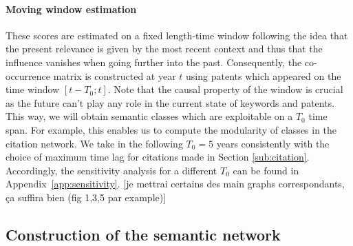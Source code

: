\documentclass[10pt,A4]{article}
\begin{document}
\paragraph{Moving window estimation}
These scores are estimated on a fixed length-time window following the idea that the present relevance is given by the most recent context and thus that the influence vanishes when going further into the past. Consequently, the co-occurrence matrix is constructed at year $t$ using patents which appeared on the time window $\left[ t - T_0 ; t \right]$. Note that the causal property of the window is crucial as the future can't play any role in the current state of keywords and patents. This way, we will obtain semantic classes which are exploitable on a $T_0$ time span. For example, this enables us to compute the modularity of classes in the citation network. We take in the following $T_0 = 5$ years consistently with the choice of maximum time lag for citations made in Section \ref{sub:citation}. Accordingly, the sensitivity analysis for a different $T_0$ can be found in Appendix~\ref{app:sensitivity}. [je mettrai certains des main graphs correspondants, ça suffira bien (fig 1,3,5 par example)]

\subsection{Construction of the semantic network}
\end{document}
